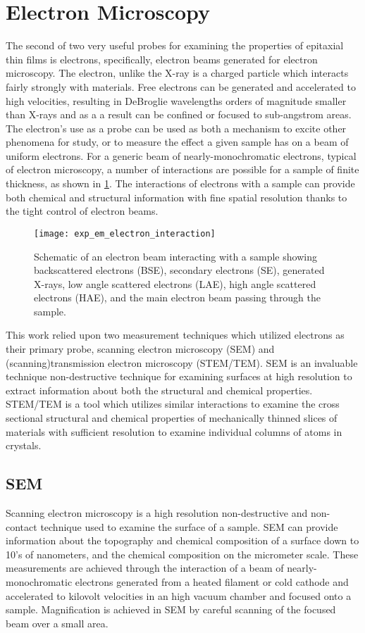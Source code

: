 \section{Electron Microscopy}
The second of two very useful probes for examining the properties of epitaxial thin films is electrons, specifically, electron beams generated for electron microscopy.
The electron, unlike the X-ray is a charged particle which interacts fairly strongly with materials.
Free electrons can be generated and accelerated to high velocities, resulting in DeBroglie wavelengths orders of magnitude smaller than X-rays and as a a result can be confined or focused to sub-angstrom areas.
The electron's use as a probe can be used as both a mechanism to excite other phenomena for study, or to measure the effect a given sample has on a beam of uniform electrons.
For a generic beam of nearly-monochromatic electrons, typical of electron microscopy, a number of interactions are possible for a sample of finite thickness, as shown in \cref{fig:exp_em_electron_interaction}.
The interactions of electrons with a sample can provide both chemical and structural information with fine spatial resolution thanks to the tight control of electron beams.
\begin{figure}
 \centering \texttt{[image: exp\_em\_electron\_interaction]}
 \caption[Electron interactions with materials]{\label{fig:exp_em_electron_interaction}Schematic of an electron beam interacting with a sample showing backscattered electrons (BSE), secondary electrons (SE), generated X-rays, low angle scattered electrons (LAE), high angle scattered electrons (HAE), and the main electron beam passing through the sample.}
\end{figure}

This work relied upon two measurement techniques which utilized electrons as their primary probe, scanning electron microscopy (SEM) and (scanning)transmission electron microscopy (STEM/TEM).
SEM is an invaluable technique non-destructive technique for examining surfaces at high resolution to extract information about both the structural and chemical properties.
STEM/TEM is a tool which utilizes similar interactions to examine the cross sectional structural and chemical properties of mechanically thinned slices of materials with sufficient resolution to examine individual columns of atoms in crystals.
\subsection{SEM} Scanning electron microscopy is a high resolution non-destructive and non-contact technique used to examine the surface of a sample.
SEM can provide information about the topography and chemical composition of a surface down to 10's of nanometers, and the chemical composition on the micrometer scale.
These measurements are achieved through the interaction of a beam of nearly-monochromatic electrons generated from a heated filament or cold cathode and accelerated to kilovolt velocities in an high vacuum chamber and focused onto a sample.
Magnification is achieved in SEM by careful scanning of the focused beam over a small area.

